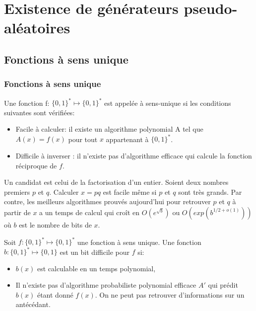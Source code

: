 \documentclass[utf8,10pt,french]{beamer}
\begin{document}
\section{Existence de générateurs pseudo-aléatoires}
\subsection{Fonctions à sens unique}
\begin{frame}
 \frametitle{Fonctions à sens unique}
\begin{definition}
Une fonction f: $\{0,1\}^* \longmapsto \{0,1\}^*$ est appelée à sens-unique si les conditions suivantes sont vérifiées:
\begin{itemize}
\item Facile à calculer: il existe un algorithme polynomial A tel que $A(x) = f(x)$ pour tout $x$ appartenant à $\{0,1\}^*$.
\item Difficile à inverser : il n'existe pas d'algorithme efficace qui calcule la fonction réciproque de $f$.
\end{itemize}
\end{definition} \pause
\begin{example}
Un candidat est celui de la factorisation d'un entier. Soient deux nombres premiers $p$ et $q$. Calculer $x=pq$ est facile même si 
$p$ et $q$ sont très grands. Par contre, les meilleurs algorithmes prouvés aujourd'hui pour retrouver $p$ et $q$ à partir de $x$ a un temps de calcul qui cro{\^i}t en $O(e^{\sqrt{b}})$ ou $O(exp(b^{1/2 + o(1)}))$ où $b$ est le nombre de bits de $x$.
\end{example}
\end{frame}

\begin{frame}
\begin{definition}
Soit $f: \{0,1\}^* \longmapsto \{0,1\}^*$ une fonction à sens unique. Une fonction $b: \{0,1\}^* \longmapsto \{0,1\}$ est un bit difficile pour $f$ si:
\begin{itemize}
\item $b(x)$ est calculable en un temps polynomial,
\item Il n'existe pas d'algorithme probabiliste polynomial efficace $A'$ qui prédit $b(x)$ étant donné $f(x)$. On ne peut pas retrouver d'informations sur un antécédant.
\end{itemize}
\end{definition} 
\end{frame}
\end{document}
